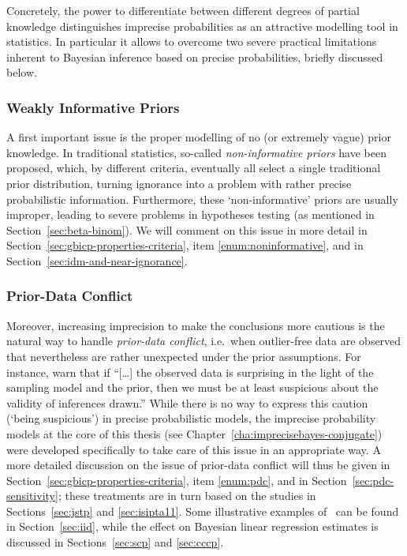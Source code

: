 Concretely, the power to differentiate between different degrees of partial knowledge
distinguishes imprecise probabilities as an attractive modelling tool in statistics.
In particular it allows to overcome two severe practical limitations inherent to Bayesian inference based on precise probabilities,
briefly discussed below.

\subsubsection{Weakly Informative Priors}
\label{sec:motivation:near-ignorance}

A first important issue is the proper modelling of no (or extremely vague) prior knowledge.
In traditional statistics, so-called \emph{non-informative priors} have been proposed, which, by different criteria,
eventually all select a single traditional prior distribution,
turning ignorance into a problem with rather precise probabilistic information.
Furthermore, these `non-informative' priors are usually improper,
leading to severe problems in hypotheses testing (as mentioned in Section~\ref{sec:beta-binom}).
We will comment on this issue in more detail in Section~\ref{sec:gbicp-properties-criteria},
item \ref{enum:noninformative}, and in Section~\ref{sec:idm-and-near-ignorance}.

\subsubsection{Prior-Data Conflict}
\label{sec:motivation:pdc}

Moreover, increasing imprecision to make the conclusions more cautious
is the natural way to handle \emph{prior-data conflict},
i.e.\ when outlier-free data are observed that nevertheless are rather unexpected under the prior assumptions.
For instance, \textcite[p.~893]{2006:evans} warn that if
``[\ldots] the observed data is surprising in the light of the sampling model and the prior,
then we must be at least suspicious about the validity of inferences drawn.''
While there is no way to express this caution (`being suspicious') in precise probabilistic models,
the imprecise probability models at the core of this thesis (see Chapter~\ref{cha:imprecisebayes-conjugate})
were developed specifically to take care of this issue in an appropriate way.
A more detailed discussion on the issue of prior-data conflict will thus be given in Section~\ref{sec:gbicp-properties-criteria},
item \ref{enum:pdc}, and in Section~\ref{sec:pdc-sensitivity};
these treatments are in turn based on the studies in Sections~\ref{sec:jstp} and \ref{sec:isipta11}.
Some illustrative examples of \pdc\ can be found in Section~\ref{sec:iid},
while the effect on Bayesian linear regression estimates is discussed in Sections~\ref{sec:scp} and \ref{sec:cccp}.

